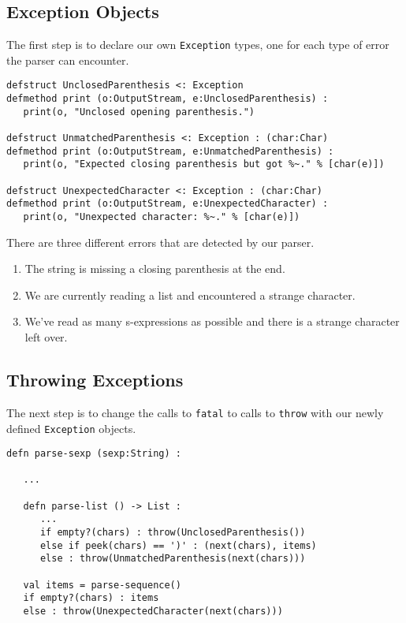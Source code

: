 \documentclass[10pt,oneside]{book}
\begin{document}
\subsection*{Exception Objects}
The first step is to declare our own \texttt{\frenchspacing Exception} types, one for each type of error the parser can encounter.
\begin{lstlisting}
defstruct UnclosedParenthesis <: Exception
defmethod print (o:OutputStream, e:UnclosedParenthesis) :
   print(o, "Unclosed opening parenthesis.")
   
defstruct UnmatchedParenthesis <: Exception : (char:Char)
defmethod print (o:OutputStream, e:UnmatchedParenthesis) :
   print(o, "Expected closing parenthesis but got %~." % [char(e)])
   
defstruct UnexpectedCharacter <: Exception : (char:Char)
defmethod print (o:OutputStream, e:UnexpectedCharacter) :
   print(o, "Unexpected character: %~." % [char(e)])
\end{lstlisting}

There are three different errors that are detected by our parser. 
\begin{enumerate}
\item The string is missing a closing parenthesis at the end.
\item We are currently reading a list and encountered a strange character.
\item We've read as many s-expressions as possible and there is a strange character left over.
\end{enumerate}

\subsection*{Throwing Exceptions}
The next step is to change the calls to \texttt{\frenchspacing fatal} to calls to \texttt{\frenchspacing throw} with our newly defined \texttt{\frenchspacing Exception} objects.
\begin{lstlisting}
defn parse-sexp (sexp:String) :

   ...
      
   defn parse-list () -> List :   
      ...
      if empty?(chars) : throw(UnclosedParenthesis())
      else if peek(chars) == ')' : (next(chars), items)
      else : throw(UnmatchedParenthesis(next(chars)))

   val items = parse-sequence()
   if empty?(chars) : items
   else : throw(UnexpectedCharacter(next(chars)))
\end{lstlisting}
\end{document}
